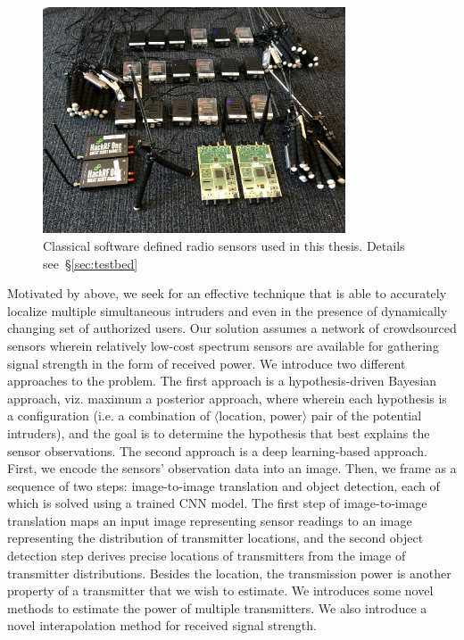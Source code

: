 \begin{figure}[t]
      \centering
      \includegraphics[width=0.8\textwidth]{figures/SDR.png}
      \caption{Classical software defined radio sensors used in this thesis. Details see~\S\ref{sec:testbed}} 
      \label{fig:intro-sdr}
\end{figure}



Motivated by above, we seek for an effective technique that is able to accurately localize multiple simultaneous
intruders and even in the presence of dynamically changing set of authorized users.
Our solution assumes a network of crowdsourced sensors wherein relatively low-cost spectrum sensors are available
for gathering signal strength in the form of received power.
We introduce two different approaches to the \mtl problem.
The first approach is a hypothesis-driven Bayesian approach, viz. maximum a posterior approach, where wherein each hypothesis is a configuration
(i.e. a combination of $\langle$location, power$\rangle$ pair of the potential intruders), and the goal is to determine the hypothesis 
that best explains the sensor observations.
The second approach is a deep learning-based approach. First, we encode the sensors' observation data into an image.
Then, we frame \mtl as a sequence of two steps: image-to-image translation 
and object detection, each of which is solved using a trained CNN model. 
The first step of image-to-image translation maps an input image representing sensor readings to an image
representing the distribution of transmitter locations, and the second object detection step derives precise locations of
transmitters from the image of transmitter distributions. 
Besides the location, the transmission power is another property of a transmitter that we wish to estimate.
We introduces some novel methods to estimate the power of multiple transmitters.
We also introduce a novel interapolation method for received signal strength.


